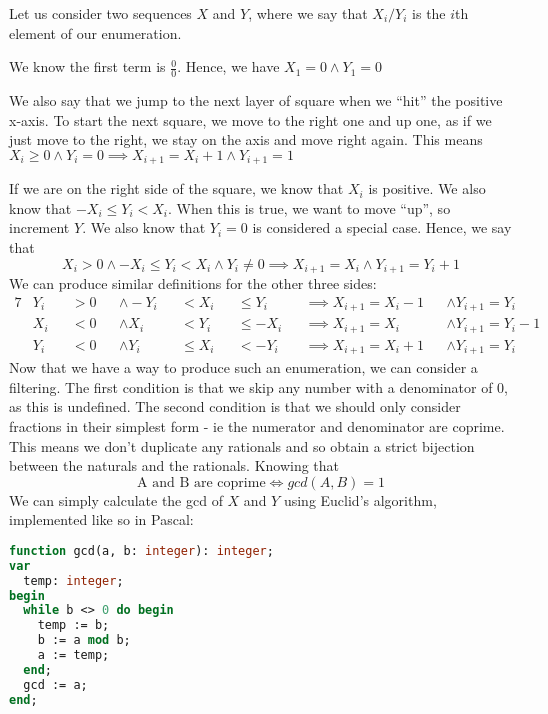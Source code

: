 \documentclass[fleqn,a4paper,11pt]{article}
\begin{document}
    Let us consider two sequences $X$ and $Y$, where we say that
    \(X_i / Y_i\) is the \(i\)th element of our enumeration.

    We know the first term is $\frac{0}{0}$. Hence, we have $X_1 = 0 \land Y_1
    = 0$

    We also say that we jump to the next layer of square when we ``hit'' the
    positive x-axis. To start the next square, we move to the right one and up
    one, as if we just move to the right, we stay on the axis and move right
    again. This means
    $X_i \geq 0 \land Y_i = 0 \implies X_{i + 1} = X_i + 1 \land Y_{i + 1} = 1$

    If we are on the right side of the square, we know that $X_i$ is positive.
    We also know that $-X_i \leq Y_i < X_i$. When this is true, we want to move
    ``up'', so increment $Y$. We also know that $Y_i = 0$ is considered a
    special case. Hence, we say that
    \begin{equation}
      X_i > 0 \land
      -X_i \leq Y_i < X_i \land
      Y_i \neq 0
    \implies
      X_{i + 1} = X_i \land
      Y_{i + 1} = Y_i + 1
    \end{equation}
    We can produce similar definitions for the other three sides:
    \begin{alignat*}{7}
    &Y_i &&> 0 &&\land -Y_i &&< X_i &&\leq Y_i &&\implies X_{i + 1} = X_i - 1 &&\land Y_{i + 1} = Y_i \\
    &X_i &&< 0 &&\land X_i &&< Y_i &&\leq -X_i &&\implies X_{i + 1} = X_i &&\land Y_{i + 1} = Y_i - 1 \\
    &Y_i &&< 0 &&\land Y_i &&\leq X_i &&< -Y_i &&\implies X_{i + 1} = X_i + 1 &&\land Y_{i + 1} = Y_i
    \end{alignat*}
    Now that we have a way to produce such an enumeration, we can consider a
    filtering. The first condition is that we skip any number with a
    denominator of 0, as this is undefined. The second condition is that we
    should only consider fractions in their simplest form - ie the numerator
    and denominator are coprime. This means we don't duplicate any rationals
    and so obtain a strict bijection between the naturals and the rationals.
    Knowing that
    \begin{equation}
        \text{A and B are coprime} \Leftrightarrow gcd(A, B) = 1
    \end{equation}
    We can simply calculate the gcd of $X$ and $Y$ using Euclid's algorithm,
    implemented like so in Pascal:

\begin{lstlisting}[language=Pascal, caption=Euclid's algorithm in Pascal]
function gcd(a, b: integer): integer;
var
  temp: integer;
begin
  while b <> 0 do begin
    temp := b;
    b := a mod b;
    a := temp;
  end;
  gcd := a;
end;
\end{lstlisting}
\end{document}
